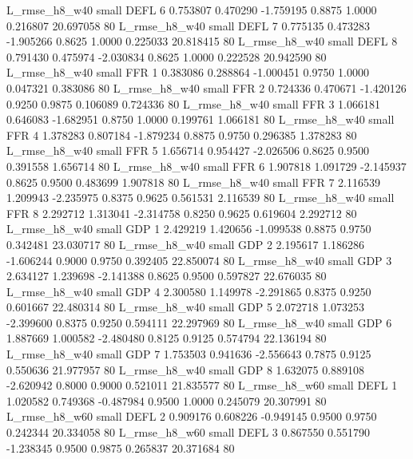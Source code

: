  L_rmse_h8_w40      small     DEFL                 6 0.753807 0.470290 -1.759195 0.8875 1.0000  0.216807   20.697058 80
 L_rmse_h8_w40      small     DEFL                 7 0.775135 0.473283 -1.905266 0.8625 1.0000  0.225033   20.818415 80
 L_rmse_h8_w40      small     DEFL                 8 0.791430 0.475974 -2.030834 0.8625 1.0000  0.222528   20.942590 80
 L_rmse_h8_w40      small      FFR                 1 0.383086 0.288864 -1.000451 0.9750 1.0000  0.047321    0.383086 80
 L_rmse_h8_w40      small      FFR                 2 0.724336 0.470671 -1.420126 0.9250 0.9875  0.106089    0.724336 80
 L_rmse_h8_w40      small      FFR                 3 1.066181 0.646083 -1.682951 0.8750 1.0000  0.199761    1.066181 80
 L_rmse_h8_w40      small      FFR                 4 1.378283 0.807184 -1.879234 0.8875 0.9750  0.296385    1.378283 80
 L_rmse_h8_w40      small      FFR                 5 1.656714 0.954427 -2.026506 0.8625 0.9500  0.391558    1.656714 80
 L_rmse_h8_w40      small      FFR                 6 1.907818 1.091729 -2.145937 0.8625 0.9500  0.483699    1.907818 80
 L_rmse_h8_w40      small      FFR                 7 2.116539 1.209943 -2.235975 0.8375 0.9625  0.561531    2.116539 80
 L_rmse_h8_w40      small      FFR                 8 2.292712 1.313041 -2.314758 0.8250 0.9625  0.619604    2.292712 80
 L_rmse_h8_w40      small      GDP                 1 2.429219 1.420656 -1.099538 0.8875 0.9750  0.342481   23.030717 80
 L_rmse_h8_w40      small      GDP                 2 2.195617 1.186286 -1.606244 0.9000 0.9750  0.392405   22.850074 80
 L_rmse_h8_w40      small      GDP                 3 2.634127 1.239698 -2.141388 0.8625 0.9500  0.597827   22.676035 80
 L_rmse_h8_w40      small      GDP                 4 2.300580 1.149978 -2.291865 0.8375 0.9250  0.601667   22.480314 80
 L_rmse_h8_w40      small      GDP                 5 2.072718 1.073253 -2.399600 0.8375 0.9250  0.594111   22.297969 80
 L_rmse_h8_w40      small      GDP                 6 1.887669 1.000582 -2.480480 0.8125 0.9125  0.574794   22.136194 80
 L_rmse_h8_w40      small      GDP                 7 1.753503 0.941636 -2.556643 0.7875 0.9125  0.550636   21.977957 80
 L_rmse_h8_w40      small      GDP                 8 1.632075 0.889108 -2.620942 0.8000 0.9000  0.521011   21.835577 80
 L_rmse_h8_w60      small     DEFL                 1 1.020582 0.749368 -0.487984 0.9500 1.0000  0.245079   20.307991 80
 L_rmse_h8_w60      small     DEFL                 2 0.909176 0.608226 -0.949145 0.9500 0.9750  0.242344   20.334058 80
 L_rmse_h8_w60      small     DEFL                 3 0.867550 0.551790 -1.238345 0.9500 0.9875  0.265837   20.371684 80
